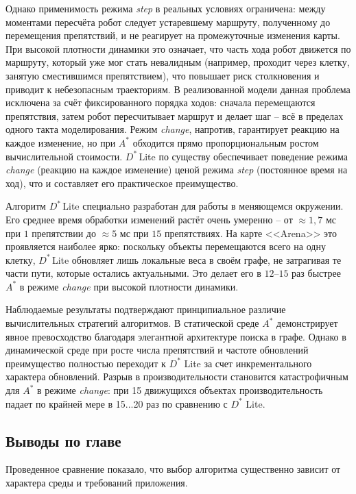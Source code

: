 \documentclass[a4paper,12pt]{extarticle}
\begin{document}
    Однако применимость режима \textit{step} в реальных условиях ограничена: между моментами пересчёта робот следует устаревшему маршруту, полученному до перемещения препятствий, и не реагирует на промежуточные изменения карты. При высокой плотности динамики это означает, что часть хода робот движется по маршруту, который уже мог стать невалидным (например, проходит через клетку, занятую сместившимся препятствием), что повышает риск столкновения и приводит к небезопасным траекториям. В реализованной модели данная проблема исключена за счёт фиксированного порядка ходов: сначала перемещаются препятствия, затем робот пересчитывает маршрут и делает шаг -- всё в пределах одного такта моделирования. Режим \textit{change}, напротив, гарантирует реакцию на каждое изменение, но при $A^*$ обходится прямо пропорциональным ростом вычислительной стоимости. $D^*$\,Lite по существу обеспечивает поведение режима \textit{change} (реакцию на каждое изменение) ценой режима \textit{step} (постоянное время на ход), что и составляет его практическое преимущество.

    Алгоритм $D^*$\,Lite специально разработан для работы в меняющемся окружении. Его среднее время обработки изменений растёт очень умеренно -- от $\approx 1{,}7$ мс при $1$ препятствии до $\approx 5$ мс при $15$ препятствиях. На карте <<Arena>> это проявляется наиболее ярко: поскольку объекты перемещаются всего на одну клетку, $D^*$\,Lite обновляет лишь локальные веса в своём графе, не затрагивая те части пути, которые остались актуальными. Это делает его в $12$--$15$ раз быстрее $A^*$ в режиме \textit{change} при высокой плотности динамики.

    Наблюдаемые результаты подтверждают принципиальное различие вычислительных стратегий алгоритмов.
    В статической среде $A^*$ демонстрирует явное превосходство благодаря элегантной архитектуре
    поиска в графе. Однако в динамической среде при росте числа препятствий и частоте обновлений
    преимущество полностью переходит к $D^*$ Lite за счет инкрементального характера обновлений.
    Разрыв в производительности становится катастрофичным для $A^*$ в режиме \textit{change}:
    при 15 движущихся объектах производительность падает по крайней мере в 15...20 раз по сравнению с $D^*$ Lite.

    \subsection{Выводы по главе}

    Проведенное сравнение показало, что выбор алгоритма существенно зависит от характера среды и требований приложения.
\end{document}
